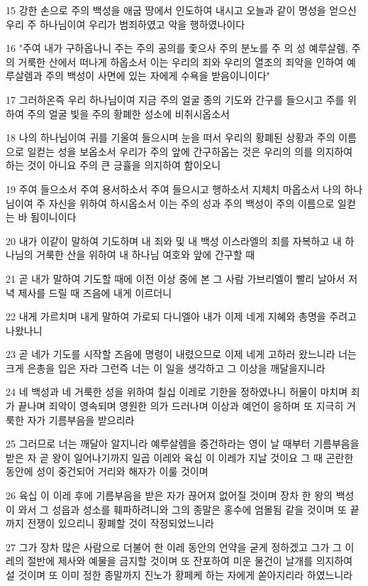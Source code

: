 \par 15 강한 손으로 주의 백성을 애굽 땅에서 인도하여 내시고 오늘과 같이 명성을 얻으신 우리 주 하나님이여 우리가 범죄하였고 악을 행하였나이다
\par 16 "주여 내가 구하옵나니 주는 주의 공의를 좇으사 주의 분노를 주 의 성 예루살렘, 주의 거룩한 산에서 떠나게 하옵소서 이는 우리의 죄와 우리의 열조의 죄악을 인하여 예루살렘과 주의 백성이 사면에 있는 자에게 수욕을 받음이니이다"
\par 17 그러하온즉 우리 하나님이여 지금 주의 얼굴 종의 기도와 간구를 들으시고 주를 위하여 주의 얼굴 빛을 주의 황폐한 성소에 비취시옵소서
\par 18 나의 하나님이여 귀를 기울여 들으시며 눈을 떠서 우리의 황폐된 상황과 주의 이름으로 일컫는 성을 보옵소서 우리가 주의 앞에 간구하옵는 것은 우리의 의를 의지하여 하는 것이 아니요 주의 큰 긍휼을 의지하여 함이오니
\par 19 주여 들으소서 주여 용서하소서 주여 들으시고 행하소서 지체치 마옵소서 나의 하나님이여 주 자신을 위하여 하시옵소서 이는 주의 성과 주의 백성이 주의 이름으로 일컫는 바 됨이니이다
\par 20 내가 이같이 말하여 기도하며 내 죄와 및 내 백성 이스라엘의 죄를 자복하고 내 하나님의 거룩한 산을 위하여 내 하나님 여호와 앞에 간구할 때
\par 21 곧 내가 말하여 기도할 때에 이전 이상 중에 본 그 사람 가브리엘이 빨리 날아서 저녁 제사를 드릴 때 즈음에 내게 이르더니
\par 22 내게 가르치며 내게 말하여 가로되 다니엘아 내가 이제 네게 지혜와 총명을 주려고 나왔나니
\par 23 곧 네가 기도를 시작할 즈음에 명령이 내렸으므로 이제 네게 고하러 왔느니라 너는 크게 은총을 입은 자라 그런즉 너는 이 일을 생각하고 그 이상을 깨달을지니라
\par 24 네 백성과 네 거룩한 성을 위하여 칠십 이레로 기한을 정하였나니 허물이 마치며 죄가 끝나며 죄악이 영속되며 영원한 의가 드러나며 이상과 예언이 응하며 또 지극히 거룩한 자가 기름부음을 받으리라
\par 25 그러므로 너는 깨달아 알지니라 예루살렘을 중건하라는 영이 날 때부터 기름부음을 받은 자 곧 왕이 일어나기까지 일곱 이레와 육십 이 이레가 지날 것이요 그 때 곤란한 동안에 성이 중건되어 거리와 해자가 이룰 것이며
\par 26 육십 이 이레 후에 기름부음을 받은 자가 끊어져 없어질 것이며 장차 한 왕의 백성이 와서 그 성읍과 성소를 훼파하려니와 그의 종말은 홍수에 엄몰됨 같을 것이며 또 끝까지 전쟁이 있으리니 황폐할 것이 작정되었느니라
\par 27 그가 장차 많은 사람으로 더불어 한 이레 동안의 언약을 굳게 정하겠고 그가 그 이레의 절반에 제사와 예물을 금지할 것이며 또 잔포하여 미운 물건이 날개를 의지하여 설 것이며 또 이미 정한 종말까지 진노가 황페케 하는 자에게 쏟아지리라 하였느니라

